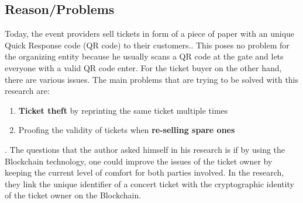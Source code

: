 \subsection*{Reason/Problems}
Today, the event providers sell tickets in form of a piece of paper with an unique Quick Response code (QR code) to their customers.. This poses no problem for the organizing entity because he usually scans a QR code at the gate and lets everyone with a valid QR code enter. For the ticket buyer on the other hand, there are various issues. The main problems that are trying to be solved with this research are:
\begin{enumerate}[label={\arabic*)},font={\color{red!50!black}\bfseries}]
	\item \textbf{Ticket theft} by reprinting the same ticket multiple times 
	\item Proofing the validity of tickets when \textbf{re-selling spare ones} 
\end{enumerate}.  
The questions that the author asked himself in his research is if by using the Blockchain technology, one could improve the issues of the ticket owner by keeping the current level of comfort for both parties involved. In the research, they link the unique identifier of a concert ticket with the cryptographic identity of the ticket owner on the Blockchain.


